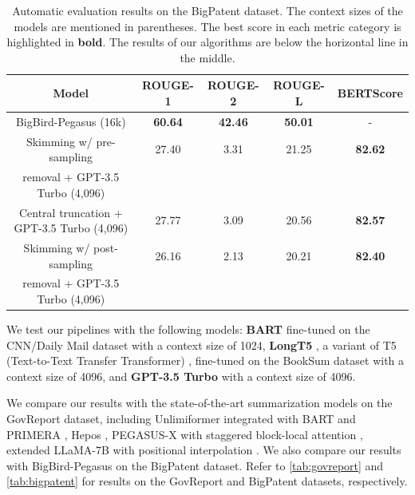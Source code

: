 \begin{table}[!ht]
  \centering

  \begin{tabular}{c c c c c}
    \hline
    Model & ROUGE-1 & ROUGE-2 & ROUGE-L & BERTScore \\
    \hline
    BigBird-Pegasus (16k) & \textbf{60.64} & \textbf{42.46} & \textbf{50.01} & - \\
    \hline
    Skimming w/ pre-sampling & 27.40 & 3.31 & 21.25 & \textbf{82.62} \\
    removal + GPT-3.5 Turbo (4,096) & & & & \\
    Central truncation + GPT-3.5 Turbo (4,096) & 27.77 & 3.09 & 20.56 & \textbf{82.57} \\
    Skimming w/ post-sampling & 26.16 & 2.13 & 20.21 & \textbf{82.40} \\
    removal + GPT-3.5 Turbo (4,096) & & & & \\
    \hline
  \end{tabular}

  \caption{
    Automatic evaluation results on the BigPatent dataset. The context sizes of the models are mentioned in parentheses.
    The best score in each metric category is highlighted in \textbf{bold}.
    The results of our algorithms are below the horizontal line in the middle.
  }
  \label{tab:bigpatent}
\end{table}

We test our pipelines with the following models: \textbf{BART} fine-tuned on the CNN/Daily Mail dataset \cite{nallapati2016abstractive} with a context size of 1024, \textbf{LongT5} \cite{guo2021longt5}, a variant of T5 (Text-to-Text Transfer Transformer) \cite{raffel2020exploring}, fine-tuned on the BookSum dataset with a context size of 4096, and \textbf{GPT-3.5 Turbo} \cite{brown2020language} with a context size of 4096.

We compare our results with the state-of-the-art summarization models on the GovReport dataset, including Unlimiformer \cite{bertsch2023unlimiformer} integrated with BART and PRIMERA \cite{beltagy2020longformer}, Hepos \cite{huang-etal-2021-efficient}, PEGASUS-X with staggered block-local attention \cite{phang2022investigating}, extended	LLaMA-7B with positional interpolation \cite{chen2023extending}.
We also compare our results with BigBird-Pegasus \cite{zaheer2020big} on the BigPatent dataset.
Refer to \autoref{tab:govreport} and \autoref{tab:bigpatent} for results on the GovReport and BigPatent datasets, respectively.

